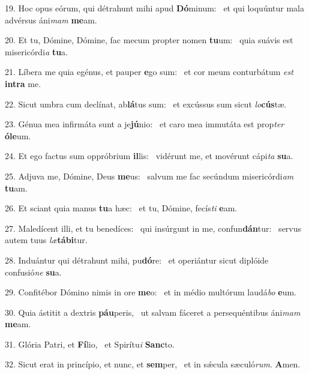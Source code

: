19. Hoc opus eórum, qui détrahunt mihi apud \textbf{Dó}minum: \ast\  et qui loquúntur mala advérsus áni\textit{mam} \textbf{me}am.\

20. Et tu, Dómine, Dómine, fac mecum propter nomen \textbf{tu}um: \ast\  quia suávis est misericórdi\textit{a} \textbf{tu}a.\

21. Líbera me quia egénus, et pauper \textbf{e}go sum: \ast\  et cor meum conturbátum \textit{est} \textbf{in}\textbf{tra} me.\

22. Sicut umbra cum declínat, ab\textbf{lá}tus sum: \ast\  et excússus sum sicut \textit{lo}\textbf{cús}tæ.\

23. Génua mea infirmáta sunt a je\textbf{jú}nio: \ast\  et caro mea immutáta est prop\textit{ter} \textbf{ó}\textbf{le}um.\

24. Et ego factus sum oppróbrium \textbf{il}lis: \ast\  vidérunt me, et movérunt cápi\textit{ta} \textbf{su}a.\

25. Adjuva me, Dómine, Deus \textbf{me}us: \ast\  salvum me fac secúndum misericórdi\textit{am} \textbf{tu}am.\

26. Et sciant quia manus \textbf{tu}a hæc: \ast\  et tu, Dómine, fecís\textit{ti} \textbf{e}am.\

27. Maledícent illi, et tu benedíces: \dag\  qui insúrgunt in me, confun\textbf{dán}tur: \ast\  servus autem tuus \textit{læ}\textbf{tá}\textbf{bi}tur.\

28. Induántur qui détrahunt mihi, pu\textbf{dó}re: \ast\  et operiántur sicut diplóide confusió\textit{ne} \textbf{su}a.\

29. Confitébor Dómino nimis in ore \textbf{me}o: \ast\  et in médio multórum laudá\textit{bo} \textbf{e}um.\

30. Quia ástitit a dextris \textbf{páu}peris, \ast\  ut salvam fáceret a persequéntibus áni\textit{mam} \textbf{me}am.\

31. Glória Patri, et \textbf{Fí}lio, \ast\  et Spirítu\textit{i} \textbf{Sanc}to.\

32. Sicut erat in princípio, et nunc, et \textbf{sem}per, \ast\  et in sǽcula sæculó\textit{rum}. \textbf{A}men.\

